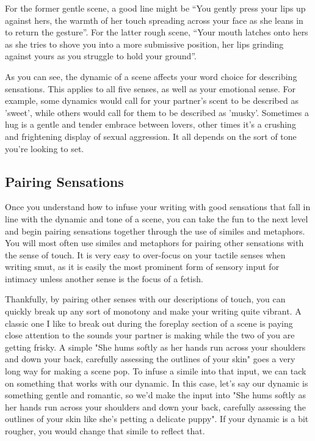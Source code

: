 ﻿\documentclass[Coomer-main.tex]{subfiles}
\begin{document}
For the former gentle scene, a good line might be “You gently press your lips up against hers, the warmth of her touch spreading across your face as she leans in to return the gesture”. For the latter rough scene, “Your mouth latches onto hers as she tries to shove you into a more submissive position, her lips grinding against yours as you struggle to hold your ground”.

As you can see, the dynamic of a scene affects your word choice for describing sensations. This applies to all five senses, as well as your emotional sense. For example, some dynamics would call for your partner's scent to be described as 'sweet', while others would call for them to be described as 'musky'. Sometimes a hug is a gentle and tender embrace between lovers, other times it’s a crushing and frightening display of sexual aggression. It all depends on the sort of tone you're looking to set.

\subsection{Pairing Sensations}

Once you understand how to infuse your writing with good sensations that fall in line with the dynamic and tone of a scene, you can take the fun to the next level and begin pairing sensations together through the use of similes and metaphors. You will most often use similes and metaphors for pairing other sensations with the sense of touch. It is very easy to over-focus on your tactile senses when writing smut, as it is easily the most prominent form of sensory input for intimacy unless another sense is the focus of a fetish.

Thankfully, by pairing other senses with our descriptions of touch, you can quickly break up any sort of monotony and make your writing quite vibrant. A classic one I like to break out during the foreplay section of a scene is paying close attention to the sounds your partner is making while the two of you are getting frisky. A simple "She hums softly as her hands run across your shoulders and down your back, carefully assessing the outlines of your skin" goes a very long way for making a scene pop. To infuse a simile into that input, we can tack on something that works with our dynamic. In this case, let's say our dynamic is something gentle and romantic, so we'd make the input into "She hums softly as her hands run across your shoulders and down your back, carefully assessing the outlines of your skin like she's petting a delicate puppy". If your dynamic is a bit rougher, you would change that simile to reflect that.
\end{document}
